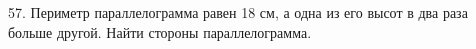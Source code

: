 57. Периметр параллелограмма равен 18 см, а одна из его высот в два раза больше другой. Найти стороны параллелограмма.\\
